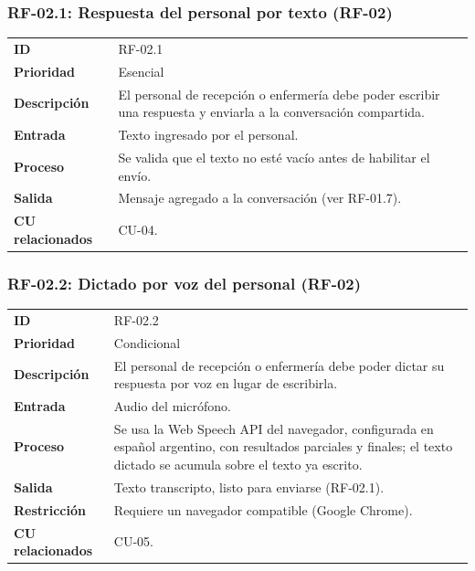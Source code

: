 \subsubsection{RF-02.1: Respuesta del personal por texto (RF-02)}
\begin{table}[H]
\centering
\begin{tabularx}{\textwidth}{l X}
\toprule
\textbf{ID} & RF-02.1 \\
\textbf{Prioridad} & Esencial \\
\textbf{Descripción} & El personal de recepción o enfermería debe poder escribir una respuesta y enviarla a la conversación compartida. \\
\textbf{Entrada} & Texto ingresado por el personal. \\
\textbf{Proceso} & Se valida que el texto no esté vacío antes de habilitar el envío. \\
\textbf{Salida} & Mensaje agregado a la conversación (ver RF-01.7). \\
\textbf{CU relacionados} & CU-04. \\
\bottomrule
\end{tabularx}
\end{table}

\subsubsection{RF-02.2: Dictado por voz del personal (RF-02)}
\begin{table}[H]
\centering
\begin{tabularx}{\textwidth}{l X}
\toprule
\textbf{ID} & RF-02.2 \\
\textbf{Prioridad} & Condicional \\
\textbf{Descripción} & El personal de recepción o enfermería debe poder dictar su respuesta por voz en lugar de escribirla. \\
\textbf{Entrada} & Audio del micrófono. \\
\textbf{Proceso} & Se usa la Web Speech API del navegador, configurada en español argentino, con resultados parciales y finales; el texto dictado se acumula sobre el texto ya escrito. \\
\textbf{Salida} & Texto transcripto, listo para enviarse (RF-02.1). \\
\textbf{Restricción} & Requiere un navegador compatible (Google Chrome). \\
\textbf{CU relacionados} & CU-05. \\
\bottomrule
\end{tabularx}
\end{table}

